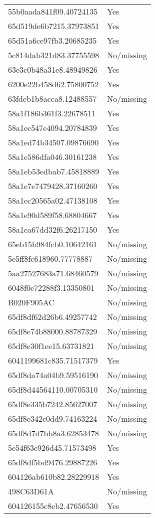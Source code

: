 \begin{tabular}{ll}
55b0aada841f09.40724135 & Yes \\
65d519de6b7215.37973851 & Yes \\
65d51a6ce97fb3.20685235 & Yes \\
5c814dab321d83.37755598 & No/missing \\
63e3c0b48a31e8.48949826 & Yes \\
6200e22b458d62.75800752 & Yes \\
63fdeb1b8acca8.12488557 & No/missing \\
58a1f186b361f3.22678511 & Yes \\
58a1ee547e4094.20784839 & Yes \\
58a1ed74b34507.09876690 & Yes \\
58a1e586dfa046.30161238 & Yes \\
58a1eb53edbab7.45818889 & Yes \\
58a1e7e7479428.37160260 & Yes \\
58a1ec20565a02.47138108 & Yes \\
58a1e90d589f58.68804667 & Yes \\
58a1ea67dd32f6.26217150 & Yes \\
65eb15b984fcb0.10642161 & No/missing \\
5e5ff8fc618960.77778887 & No/missing \\
5aa27527683a71.68460579 & No/missing \\
6048f0e72288f3.13350801 & No/missing \\
B020F905AC & No/missing \\
65df8df62d26b6.49257742 & No/missing \\
65df8e74b88000.88787329 & No/missing \\
65df8e30f1ee15.63731821 & No/missing \\
6041199681c835.71517379 & Yes \\
65df8da74a04b9.59516190 & No/missing \\
65df8d44564110.00705310 & No/missing \\
65df8e335b7242.85627007 & No/missing \\
65df8e342c0dd9.74163224 & No/missing \\
65df8d7d7bb8a3.62853478 & No/missing \\
5e54f63e926d45.71573498 & Yes \\
65df8df5bd9476.29887226 & Yes \\
604126ab610b82.28229918 & Yes \\
498C63D61A & No/missing \\
604126155c8eb2.47656530 & Yes \\

\end{tabular}
